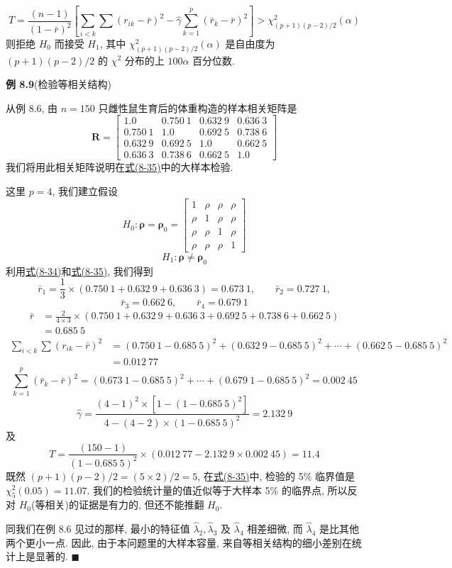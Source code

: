 
\label{eq:8-35}
\begin{equation}
T=\frac{(n-1)}{(1-\bar{r})^2}\left[\sum_{i<k}\sum(r_{ik}-\bar{r})^2-\hat{\gamma}\sum_{k=1}^{p}(\bar{r}_k-\bar{r})^2\right]>\chi_{(p+1)(p-2)/2}^{2}(\alpha) \tag{8-35}
\end{equation}
则拒绝 $H_0$ 而接受 $H_1$, 其中 $\chi_{(p+1)(p-2)/2}^2(\alpha)$ 是自由度为 $(p+1)(p-2)/2$ 的 $\chi^2$ 分布的上 $100\alpha$ 百分位数.

\noindent\textbf{例 8.9}\quad (检验等相关结构)

从例 8.6, 由 $n=150$ 只雌性鼠生育后的体重构造的样本相关矩阵是
\[
\mathbf{R}=\begin{bmatrix}
1.0&0.750\ 1&0.632\ 9&0.636\ 3\\
0.750\ 1&1.0&0.692\ 5&0.738\ 6\\
0.632\ 9&0.692\ 5&1.0&0.662\ 5\\
0.636\ 3&0.738\ 6&0.662\ 5&1.0
\end{bmatrix}
\]
我们将用此相关矩阵说明在\hyperref[eq:8-35]{式(8-35)}中的大样本检验.

这里 $p=4$, 我们建立假设
\[
H_0:\boldsymbol{\rho}=\boldsymbol{\rho}_0=
\begin{bmatrix}
1&\rho&\rho&\rho\\
\rho&1&\rho&\rho\\
\rho&\rho&1&\rho\\
\rho&\rho&\rho&1
\end{bmatrix}
\]
\[
H_1:\boldsymbol{\rho}\neq\boldsymbol{\rho}_0
\]
利用\hyperref[eq:8-34]{式(8-34)}和\hyperref[eq:8-35]{式(8-35)}, 我们得到
\[
\bar{r}_1=\frac{1}{3}\times(0.750\ 1+0.632\ 9+0.636\ 3)=0.673\ 1,\qquad \bar{r}_2=0.727\ 1,
\]
\[
\bar{r}_3=0.662\ 6,\qquad \bar{r}_4=0.679\ 1
\]
\[
\begin{aligned}
\bar{r}&=\frac{2}{4\times 3}\times(0.750\ 1+0.632\ 9+0.636\ 3+0.692\ 5+0.738\ 6+0.662\ 5)\\
&=0.685\ 5
\end{aligned}
\]
\[
\begin{aligned}
\sum_{i<k}\sum(r_{ik}-\bar{r})^2&=(0.750\ 1-0.685\ 5)^2+(0.632\ 9-0.685\ 5)^2+\cdots+(0.662\ 5-0.685\ 5)^2\\
&=0.012\ 77
\end{aligned}
\]
\[
\sum_{k=1}^{p}(\bar{r}_k-\bar{r})^2=(0.673\ 1-0.685\ 5)^2+\cdots+(0.679\ 1-0.685\ 5)^2=0.002\ 45
\]
\[
\hat{\gamma}=\frac{(4-1)^2\times[1-(1-0.685\ 5)^2]}{4-(4-2)\times(1-0.685\ 5)^2}=2.132\ 9
\]
及
\[
T=\frac{(150-1)}{(1-0.685\ 5)^2}\times(0.012\ 77-2.132\ 9\times 0.002\ 45)=11.4
\]
既然 $(p+1)(p-2)/2=(5\times 2)/2=5$, 在\hyperref[eq:8-35]{式(8-35)}中, 检验的 5\% 临界值是 $\chi_5^2(0.05)=11.07$. 我们的检验统计量的值近似等于大样本 5\% 的临界点, 所以反对 $H_0$(等相关)的证据是有力的, 但还不能推翻 $H_0$.

同我们在例 8.6 见过的那样, 最小的特征值 $\hat{\lambda}_2,\hat{\lambda}_3$ 及 $\hat{\lambda}_4$ 相差细微, 而 $\hat{\lambda}_4$ 是比其他两个更小一点. 因此, 由于本问题里的大样本容量, 来自等相关结构的细小差别在统计上是显著的. \hfill$\blacksquare$
